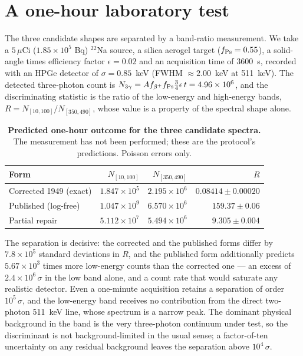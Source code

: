 \documentclass[11pt,a4paper]{article}
\begin{document}
\section{A one-hour laboratory test}
The three candidate shapes are separated by a band-ratio measurement.
We take a $5\,\mu$Ci ($1.85\times 10^5$ Bq) $^{22}$Na source,
a silica aerogel target ($f_{\rm Ps} = 0.55$), a solid-angle
times efficiency factor $\epsilon = 0.02$ and an acquisition time
of $3600$~s, recorded with an HPGe detector of
$\sigma = 0.85$~keV (FWHM $\approx 2.00$~keV at 511~keV). The
detected three-photon count is
$N_{3\gamma} = A f_{\beta^+} f_{\rm Ps} \tfrac{3}{4}\epsilon\,t = 4.96\times 10^{6}$,
and the discriminating statistic is the ratio of the low-energy and
high-energy bands,
$R = N_{[10,100]}/N_{[350,490]}$, whose value is a property of the
spectral shape alone.

\begin{table}[!htbp]
\centering\footnotesize
\setlength{\tabcolsep}{4pt}
\caption{\textbf{Predicted one-hour outcome for the three candidate spectra.}
The measurement has not been performed; these are the protocol's
predictions. Poisson errors only.}
\label{tab:na22}
\vspace{0.1cm}
\begin{tabular}{@{}lrrr@{}}
\toprule
Form & $N_{[10,100]}$ & $N_{[350,490]}$ & $R$ \\
\midrule
Corrected 1949 (exact) & $1.847\times 10^{5}$ & $2.195\times 10^{6}$ & $0.08414\pm 0.00020$ \\
Published (log-free) & $1.047\times 10^{9}$ & $6.570\times 10^{6}$ & $159.37\pm 0.06$ \\
Partial repair & $5.112\times 10^{7}$ & $5.494\times 10^{6}$ & $9.305\pm 0.004$ \\
\bottomrule
\end{tabular}
\end{table}

The separation is decisive: the corrected and the published forms
differ by $7.8\times 10^{5}$ standard deviations in $R$, and the
published form additionally predicts $5.67\times 10^{3}$ times more
low-energy counts than the corrected one --- an excess of
$2.4\times 10^{6}\,\sigma$ in the low band alone, and a count rate
that would saturate any realistic detector. Even a one-minute
acquisition retains a separation of order $10^{5}\,\sigma$, and
the low-energy band receives no contribution from the direct
two-photon 511~keV line, whose spectrum is a narrow peak. The
dominant physical background in the band is the very three-photon
continuum under test, so the discriminant is not background-limited
in the usual sense; a factor-of-ten uncertainty on any residual
background leaves the separation above $10^{4}\,\sigma$.
\end{document}
